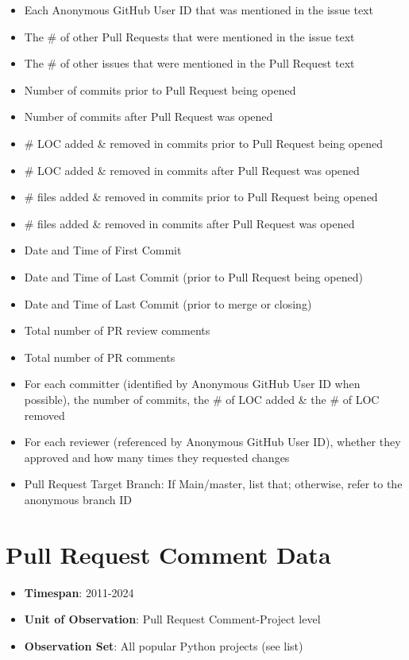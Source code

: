 \documentclass[12pt,notitlepage]{article}
\begin{document}
\begin{itemize}
    \item Each Anonymous GitHub User ID that was mentioned in the issue text
    \item The \# of other Pull Requests that were mentioned in the issue text
    \item The \# of other issues that were mentioned in the Pull Request text
    \item Number of commits prior to Pull Request being opened
    \item Number of commits after Pull Request was opened
    \item \# LOC added \& removed in commits prior to Pull Request being opened
    \item \# LOC added \& removed in commits after Pull Request was opened
    \item \# files added \& removed in commits prior to Pull Request being opened
    \item \# files added \& removed in commits after Pull Request was opened
    \item Date and Time of First Commit
    \item Date and Time of Last Commit (prior to Pull Request being opened)
    \item Date and Time of Last Commit (prior to merge or closing)
    \item Total number of PR review comments
    \item Total number of PR comments
    \item For each committer (identified by Anonymous GitHub User ID when possible), the number of commits, the \# of LOC added \& the \# of LOC removed
    \item For each reviewer (referenced by Anonymous GitHub User ID), whether they approved and how many times they requested changes
    \item Pull Request Target Branch: If Main/master, list that; otherwise, refer to the anonymous branch ID
\end{itemize}

\section*{Pull Request Comment Data}
\begin{itemize}
    \item \textbf{Timespan}: 2011-2024
    \item \textbf{Unit of Observation}: Pull Request Comment-Project level
    \item \textbf{Observation Set}: All popular Python projects (see list)
\end{itemize}
\end{document}
